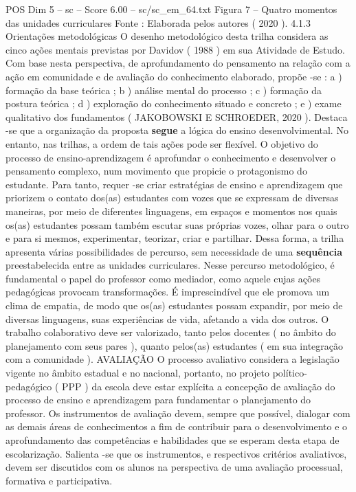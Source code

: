 \begin{textsample}{POS Dim 5 – sc – Score 6.00 – sc/sc\_em\_64.txt}
Figura 7 – Quatro momentos das unidades curriculares Fonte : Elaborada pelos autores ( 2020 ). 4.1.3 Orientações metodológicas O desenho metodológico desta trilha considera as cinco ações mentais previstas por Davidov ( 1988 ) em sua Atividade de Estudo.
Com base nesta perspectiva, de aprofundamento do pensamento na relação com a ação em comunidade e de avaliação do conhecimento elaborado, propõe -se : a ) formação da base teórica ; b ) análise mental do processo ; c ) formação da postura teórica ; d ) exploração do conhecimento situado e concreto ; e ) exame qualitativo dos fundamentos ( JAKOBOWSKI E SCHROEDER, 2020 ).
Destaca -se que a organização da proposta \textbf{segue} a lógica do ensino desenvolvimental.
No entanto, nas trilhas, a ordem de tais ações pode ser flexível.
O objetivo do processo de ensino-aprendizagem é aprofundar o conhecimento e desenvolver o pensamento complexo, num movimento que propicie o protagonismo do estudante.
Para tanto, requer -se criar estratégias de ensino e aprendizagem que priorizem o contato dos(as) estudantes com vozes que se expressam de diversas maneiras, por meio de diferentes linguagens, em espaços e momentos nos quais os(as) estudantes possam também escutar suas próprias vozes, olhar para o outro e para si mesmos, experimentar, teorizar, criar e partilhar.
Dessa forma, a trilha apresenta várias possibilidades de percurso, sem necessidade de uma \textbf{sequência} preestabelecida entre as unidades curriculares.
Nesse percurso metodológico, é fundamental o papel do professor como mediador, como aquele cujas ações pedagógicas provocam transformações.
É imprescindível que ele promova um clima de empatia, de modo que os(as) estudantes possam expandir, por meio de diversas linguagens, suas experiências de vida, afetando a vida dos outros.
O trabalho colaborativo deve ser valorizado, tanto pelos docentes ( no âmbito do planejamento com seus pares ), quanto pelos(as) estudantes ( em sua integração com a comunidade ).
AVALIAÇÃO O processo avaliativo considera a legislação vigente no âmbito estadual e no nacional, portanto, no projeto político-pedagógico ( PPP ) da escola deve estar explícita a concepção de avaliação do processo de ensino e aprendizagem para fundamentar o planejamento do professor.
Os instrumentos de avaliação devem, sempre que possível, dialogar com as demais áreas de conhecimentos a fim de contribuir para o desenvolvimento e o aprofundamento das competências e habilidades que se esperam desta etapa de escolarização.
Salienta -se que os instrumentos, e respectivos critérios avaliativos, devem ser discutidos com os alunos na perspectiva de uma avaliação processual, formativa e participativa.

\end{textsample}
